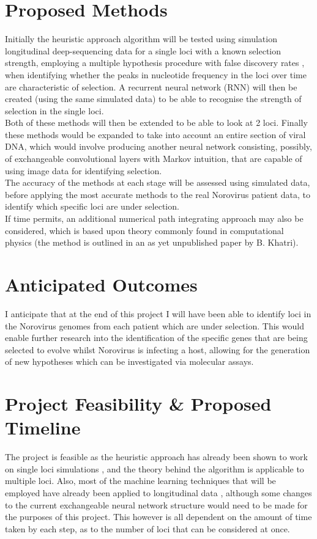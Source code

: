 \documentclass[a4paper, margin=2cm, 11pt]{article}
\begin{document}
\begin{onehalfspacing}
\section{Proposed Methods}
Initially the heuristic approach algorithm \citep{Khatri2016} will be tested using simulation longitudinal deep-sequencing data for a single loci with a known selection strength, employing a multiple hypothesis procedure with false discovery rates \citep{Benjamini1995}, when identifying whether the peaks in nucleotide frequency in the loci over time are characteristic of selection. A recurrent neural network (RNN) will then be created (using the same simulated data) to be able to recognise the strength of selection in the single loci.\\
Both of these methods will then be extended to be able to look at 2 loci. Finally these methods would be expanded to take into account an entire section of viral DNA, which would involve producing another neural network consisting, possibly, of exchangeable convolutional layers \citep{Chan} with Markov intuition, that are capable of using image data for identifying selection.\\
The accuracy of the methods at each stage will be assessed using simulated data, before applying the most accurate methods to the real Norovirus patient data, to identify which specific loci are under selection.\\
If time permits, an additional numerical path integrating approach may also be considered, which is based upon theory commonly found in computational physics (the method is outlined in an as yet unpublished paper by B. Khatri).

\section{Anticipated Outcomes}
I anticipate that at the end of this project I will have been able to identify loci in the Norovirus genomes from each patient which are under selection. This would enable further research into the identification of the specific genes that are being selected to evolve whilst Norovirus is infecting a host, allowing for the generation of new hypotheses which can be investigated via molecular assays.

\section{Project Feasibility \& Proposed Timeline}
The project is feasible as the heuristic approach has already been shown to work on single loci simulations \citep{Khatri2016}, and the theory behind the algorithm is applicable to multiple loci. Also, most of the machine learning techniques that will be employed have already been applied to longitudinal data \citep{Choi2017, Wang2018}, although some changes to the current exchangeable neural network structure \citep{Chan} would need to be made for the purposes of this project. This however is all dependent on the amount of time taken by each step, as to the number of loci that can be considered at once.

\end{onehalfspacing}
\end{document}
